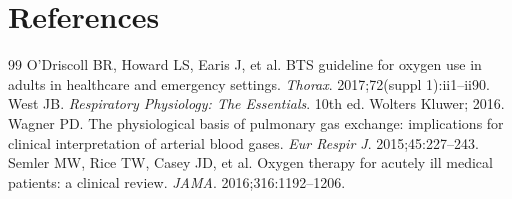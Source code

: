 \section*{References}
\begin{thebibliography}{99}
 O'Driscoll BR, Howard LS, Earis J, et al. BTS guideline for oxygen use in adults in healthcare and emergency settings. \textit{Thorax}. 2017;72(suppl 1):ii1--ii90.
 West JB. \textit{Respiratory Physiology: The Essentials}. 10th ed. Wolters Kluwer; 2016.
 Wagner PD. The physiological basis of pulmonary gas exchange: implications for clinical interpretation of arterial blood gases. \textit{Eur Respir J}. 2015;45:227--243.
 Semler MW, Rice TW, Casey JD, et al. Oxygen therapy for acutely ill medical patients: a clinical review. \textit{JAMA}. 2016;316:1192--1206.
\end{thebibliography}
